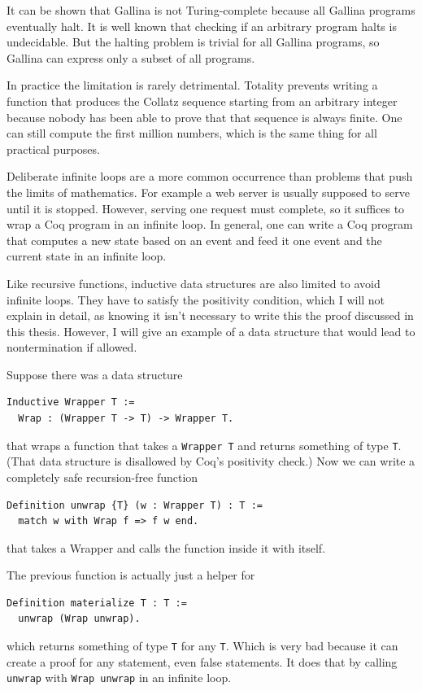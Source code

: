 \documentclass[english, 12pt, a4paper, sci, a-1b, online]{aaltothesis}
\newcommand\icoq[1]{\texttt{#1}}
\begin{document}
It can be shown that Gallina is not Turing-complete because all Gallina programs eventually halt. It is well known that checking if an arbitrary program halts is undecidable. But the halting problem is trivial for all Gallina programs, so Gallina can express only a subset of all programs.

In practice the limitation is rarely detrimental. Totality prevents writing a function that produces the Collatz sequence starting from an arbitrary integer because nobody has been able to prove that that sequence is always finite. One can still compute the first million numbers, which is the same thing for all practical purposes.

Deliberate infinite loops are a more common occurrence than problems that push the limits of mathematics. For example a web server is usually supposed to serve until it is stopped. However, serving one request must complete, so it suffices to wrap a Coq program in an infinite loop. In general, one can write a Coq program that computes a new state based on an event and feed it one event and the current state in an infinite loop.

Like recursive functions, inductive data structures are also limited to avoid infinite loops. They have to satisfy the positivity condition, which I will not explain in detail, as knowing it isn't necessary to write this the proof discussed in this thesis. However, I will give an example of a data structure that would lead to nontermination if allowed.

Suppose there was a data structure
\begin{verbatim}
Inductive Wrapper T :=
  Wrap : (Wrapper T -> T) -> Wrapper T.
\end{verbatim}
that wraps a function that takes a \icoq{Wrapper T} and returns something of type \icoq{T}. (That data structure is disallowed by Coq's positivity check.) Now we can write a completely safe recursion-free function
\begin{verbatim}
Definition unwrap {T} (w : Wrapper T) : T :=
  match w with Wrap f => f w end.
\end{verbatim}
that takes a Wrapper and calls the function inside it with itself.

The previous function is actually just a helper for
\begin{verbatim}
Definition materialize T : T :=
  unwrap (Wrap unwrap).
\end{verbatim}
which returns something of type \icoq{T} for any \icoq{T}. Which is very bad because it can create a proof for any statement, even false statements. It does that by calling \icoq{unwrap} with \icoq{Wrap unwrap} in an infinite loop.
\end{document}
